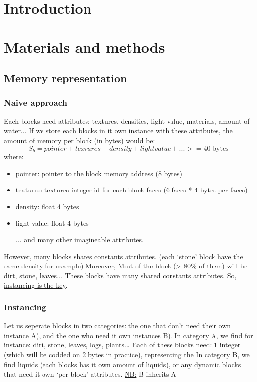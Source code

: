 \documentclass[11pt]{article}
\begin{document}
	\section{Introduction}
	\newpage

	\section{Materials and methods}
		\subsection{Memory representation}
			\subsubsection{Naive approach}
				Each blocks need attributes: textures, densities, light value, materials, amount of water...											\newline
				If we store each blocks in it own instance with these attributes, the amount of memory per block (in bytes) would be:
				\[S_{b}=pointer + textures + density + light value + ... >= 40 \textrm{ bytes}\]
				where:
				\begin{itemize}
					\item pointer: pointer to the block memory address (8 bytes)
					\item textures: textures integer id for each block faces (6 faces * 4 bytes per faces)
					\item density: float 4 bytes
					\item light value: float 4 bytes
					\item [...] and many other imagineable attributes.
				\end{itemize}
				However, many blocks \underline{shares constants attributes}. (each `stone' block have the same density for example)
				\newline
				Moreover, Most of the block (> 80\% of them) will be dirt, stone, leaves...
				These blocks have many shared constants attributes. So, \underline{instancing is the key}.
				\newline
			
			\subsubsection{Instancing}
				Let us seperate blocks in two categories: the one that don't need their own instance A), and the one who need it own 							instances B).
				\newline
				\newline
				In category A, we find for instance: dirt, stone, leaves, logs, plants...
				\newline
				\newline
				Each of these blocks need: 1 integer (which will be codded on 2 bytes in practice), representing the 
				In category B, we find liquids (each blocks has it own amount of liquids), or any dynamic blocks that need it own `per block' 						attributes.
				\newline
				\underline{NB:} B inherits A
			
\end{document}
